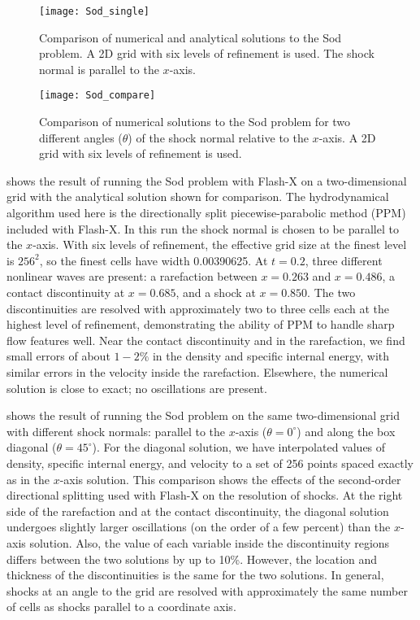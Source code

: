 \begin{figure}
\begin{center}
{\leavevmode\texttt{[image: Sod\_single]}}
\end{center}
\caption{\label{Fig:Sod single} Comparison of numerical and analytical
solutions to the Sod problem. A 2D grid with six levels of refinement
is used. The shock normal is parallel to the $x$-axis.
}
\end{figure}
\begin{figure}
\begin{center}
{\leavevmode\texttt{[image: Sod\_compare]}}
\end{center}
\caption{\label{Fig:Sod comparison} Comparison of numerical
solutions to the Sod problem for two different angles ($\theta$) of the
shock normal relative to the $x$-axis. A 2D grid with six levels of
refinement is used.
}
\end{figure}

 shows the result of running the Sod problem
with Flash-X on a two-dimensional grid with the analytical solution
shown for comparison. The hydrodynamical algorithm used here is the
directionally split piecewise-parabolic method (PPM) included with
Flash-X. In this run the shock normal is chosen to be parallel to the
$x$-axis. With six levels of refinement, the effective grid size at
the finest level is $256^2$, so the finest cells have width
0.00390625. At $t=0.2$, three different nonlinear waves are present:
a rarefaction between $x = 0.263$ and $x = 0.486$, a contact
discontinuity at $x = 0.685$, and a shock at $x = 0.850$. The two
discontinuities are resolved with approximately two to three cells
each at the highest level of refinement, demonstrating the ability
of PPM to handle sharp flow features well. Near the contact
discontinuity and in the rarefaction, we find small errors of about
$1-2\%$ in the density and specific internal energy, with similar
errors in the velocity inside the rarefaction. Elsewhere, the
numerical solution is close to exact; no oscillations are present.

 shows the result of running the Sod
problem on the same two-dimensional grid with different shock
normals: parallel to the $x$-axis ($\theta=0^\circ$) and along the
box diagonal ($\theta=45^\circ$). For the diagonal solution, we have
interpolated values of density, specific internal energy, and
velocity to a set of 256 points spaced exactly as in the $x$-axis
solution. This comparison shows the effects of the second-order
directional splitting used with Flash-X on the resolution of shocks.
At the right side of the rarefaction and at the contact
discontinuity, the diagonal solution undergoes slightly larger
oscillations (on the order of a few percent) than the $x$-axis
solution. Also, the value of each variable inside the discontinuity
regions differs between the two solutions by up to 10\%. However,
the location and thickness of the discontinuities is the same for
the two solutions. In general, shocks at an angle to the grid are
resolved with approximately the same number of cells as shocks
parallel to a coordinate axis.

